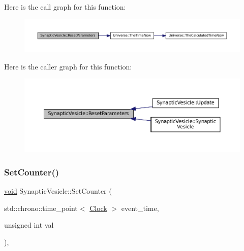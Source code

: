 Here is the call graph for this function\+:\nopagebreak
\begin{figure}[H]
\begin{center}
\leavevmode
\includegraphics[width=350pt]{class_synaptic_vesicle_add2f2815448729977fbcdbd5a59ec7b4_cgraph}
\end{center}
\end{figure}
Here is the caller graph for this function\+:\nopagebreak
\begin{figure}[H]
\begin{center}
\leavevmode
\includegraphics[width=350pt]{class_synaptic_vesicle_add2f2815448729977fbcdbd5a59ec7b4_icgraph}
\end{center}
\end{figure}
\mbox{\label{class_synaptic_vesicle_a7fd7cfce5eccb904206d968866f85220}} 
\subsubsection{\texorpdfstring{Set\+Counter()}{SetCounter()}}
{\footnotesize\ttfamily \mbox{\hyperlink{glad_8h_a950fc91edb4504f62f1c577bf4727c29}{void}} Synaptic\+Vesicle\+::\+Set\+Counter (\begin{DoxyParamCaption}\item[{std\+::chrono\+::time\+\_\+point$<$ \mbox{\hyperlink{universe_8h_a0ef8d951d1ca5ab3cfaf7ab4c7a6fd80}{Clock}} $>$}]{event\+\_\+time,  }\item[{unsigned int}]{val }\end{DoxyParamCaption})\hspace{0.3cm}{\ttfamily [inline]}, {\ttfamily [virtual]}}



